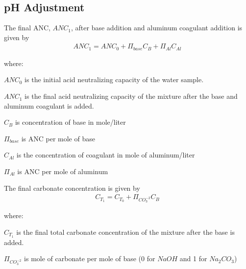 \documentclass[letterpaper,10pt,english]{sphinxmanual}
\begin{document}
\subsection{pH Adjustment}
\label{\detokenize{Rapid_Mix/RM_Derivations:ph-adjustment}}\label{\detokenize{Rapid_Mix/RM_Derivations:heading-ph-adjustment}}
The final ANC, \(ANC_1\), after base addition and aluminum coagulant addition is given by
\begin{equation}\label{equation:Rapid_Mix/RM_Derivations:Rapid_Mix/RM_Derivations:17}
\begin{split}ANC_1 = ANC_0 + \Pi_{base}C_B + \Pi_{Al}C_{Al}\end{split}
\end{equation}
\begin{DUlineblock}{0em}
\item[] where:
\item[] \(ANC_0\) is the initial acid neutralizing capacity of the water sample.
\item[] \(ANC_1\) is the final acid neutralizing capacity of the mixture after the base and aluminum coagulant is added.
\item[] \(C_B\) is concentration of base in mole/liter
\item[] \(\Pi_{base}\) is ANC per mole of base
\item[] \(C_{Al}\) is the concentration of coagulant in mole of aluminum/liter
\item[] \(\Pi_{Al}\) is ANC per mole of aluminum
\end{DUlineblock}

The final carbonate concentration is given by
\begin{equation}\label{equation:Rapid_Mix/RM_Derivations:Rapid_Mix/RM_Derivations:18}
\begin{split}C_{T_1} ={C_{T_0}}+ \Pi_{CO_3^{-2}}C_B\end{split}
\end{equation}
\begin{DUlineblock}{0em}
\item[] where:
\item[] \(C_{T_1}\) is the final total carbonate concentration of the mixture after the base is added.
\item[] \(\Pi_{CO_3^{-2}}\) is mole of carbonate per mole of base (0 for \(NaOH\) and 1 for \(Na_2CO_3\))
\end{DUlineblock}
\end{document}
